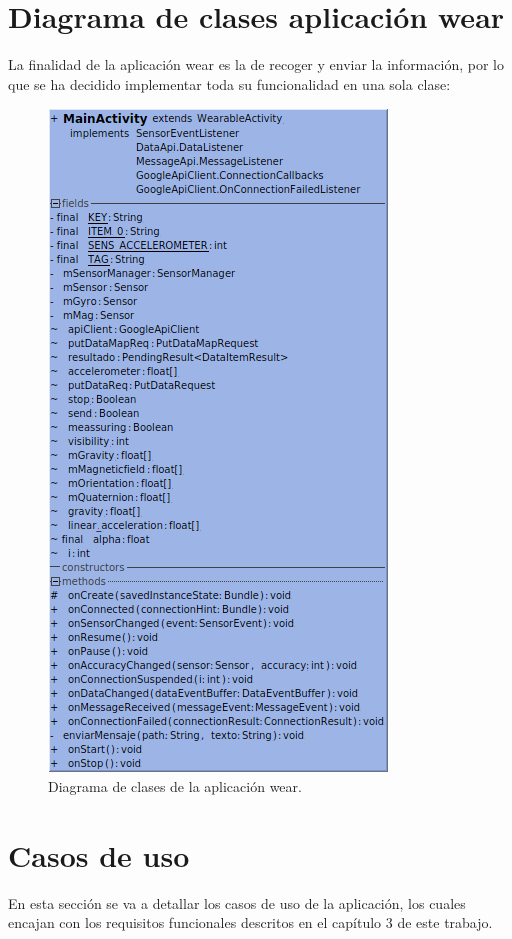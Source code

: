 \section{Diagrama de clases aplicación wear}

La finalidad de la aplicación wear es la de recoger y enviar la información, por lo que se ha decidido implementar toda su funcionalidad en una sola clase:

\begin{figure}[H]
	\centering
	\includegraphics[scale=0.7]{imagenes/clasesW.png}
	\caption{Diagrama de clases de la aplicación wear.}
	\label{Diagrama de clases wear}
\end{figure}

\section{Casos de uso}

En esta sección se va a detallar los casos de uso de la aplicación, los cuales encajan con los requisitos funcionales descritos en el capítulo 3 de este trabajo.\\
\\

